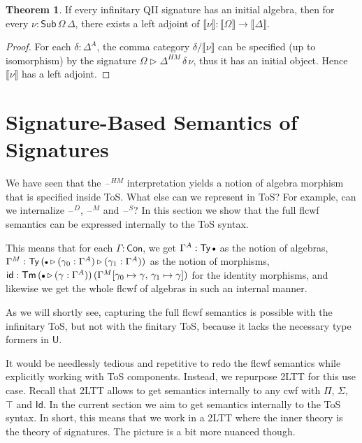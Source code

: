 \documentclass[12pt,a4paper,twoside,openany]{book}
\theoremstyle{remark}
\theoremstyle{definition}
\theoremstyle{theorem}
\newtheorem{theorem}{Theorem}
\newcommand{\id}{\mathsf{id}}
\newcommand{\Con}{\mathsf{Con}}
\newcommand{\Sub}{\mathsf{Sub}}
\newcommand{\Tm}{\mathsf{Tm}}
\newcommand{\Ty}{\mathsf{Ty}}
\newcommand{\U}{\mathsf{U}}
\newcommand{\Id}{\mathsf{Id}}
\newcommand{\blank}{\mathord{\hspace{1pt}\text{--}\hspace{1pt}}}
\newcommand{\ext}{\triangleright}
\newcommand{\emptycon}{\scaleobj{.75}\bullet}
\newcommand{\llb}{\llbracket}
\newcommand{\rrb}{\rrbracket}
\newcommand{\sem}[1]{\llb#1\rrb}
\begin{document}
\begin{theorem}
If every infinitary QII signature has an initial algebra, then for every $\nu :
\Sub\,\Omega\,\Delta$, there exists a left adjoint of $\sem{\nu} : \sem{\Omega}
\to \sem{\Delta}$.
\end{theorem}
\begin{proof}
For each $\delta : \Delta^A$, the comma category $\delta/\sem{\nu}$ can be
specified (up to isomorphism) by the signature $\Omega \ext
\Delta^{HM}\,\delta\,\nu$, thus it has an initial object. Hence $\sem{\nu}$ has
a left adjoint.
\end{proof}

\section{Signature-Based Semantics of Signatures}
\label{sec:signature-semantics}

We have seen that the $\blank^{HM}$ interpretation yields a notion of algebra
morphism that is specified inside ToS. What else can we represent in ToS? For
example, can we internalize $\blank^D$, $\blank^M$ and $\blank^S$? In this
section we show that the full flcwf semantics can be expressed internally to
the ToS syntax.

This means that for each $\Gamma : \Con$, we get $\Gamma^A : \Ty\,\emptycon$ as
the notion of algebras, $\Gamma^M : \Ty\,(\emptycon\ext(\gamma_0 :
\Gamma^A)\ext(\gamma_1 : \Gamma^A))$ as the notion of morphisms, $\id :
\Tm\,(\emptycon\ext(\gamma : \Gamma^A))\,(\Gamma^M[\gamma_0 \mapsto
  \gamma,\,\gamma_1 \mapsto \gamma])$ for the identity morphisms, and likewise
we get the whole flcwf of algebras in such an internal manner.

As we will shortly see, capturing the full flcwf semantics is possible with the
infinitary ToS, but not with the finitary ToS, because it lacks the necessary
type formers in $\U$.

It would be needlessly tedious and repetitive to redo the flcwf semantics while
explicitly working with ToS components. Instead, we repurpose 2LTT for this use
case. Recall that 2LTT allows to get semantics internally to any cwf with $\Pi$,
$\Sigma$, $\top$ and $\Id$. In the current section we aim to get semantics
internally to the ToS syntax. In short, this means that we work in a 2LTT where
the inner theory is the theory of signatures. The picture is a bit more
nuanced though.
\end{document}
